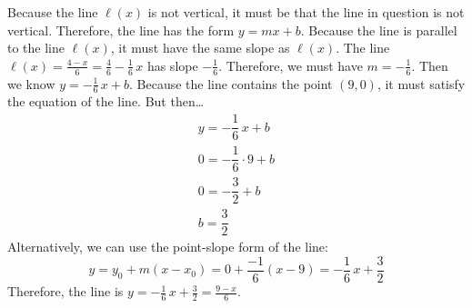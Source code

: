 \documentclass[11pt,letterpaper]{article}
\begin{document}
\sol Because the line $\ell(x)$ is not vertical, it must be that the line in question is not vertical. Therefore, the line has the form $y= mx + b$. Because the line is parallel to the line $\ell(x)$, it must have the same slope as $\ell(x)$. The line $\ell(x)= \frac{4 - x}{6}= \frac{4}{6} - \frac{1}{6}\,x$ has slope $-\frac{1}{6}$. Therefore, we must have $m= -\frac{1}{6}$. Then we know $y= -\frac{1}{6}\,x + b$. Because the line contains the point $(9, 0)$, it must satisfy the equation of the line. But then\dots
	\[
	\begin{gathered}
	y= -\dfrac{1}{6}\,x + b \\
	0= -\dfrac{1}{6} \cdot 9 + b \\
	0= -\dfrac{3}{2} + b \\
	b= \dfrac{3}{2}
	\end{gathered}
	\]
Alternatively, we can use the point-slope form of the line:
	\[
	y= y_0 + m(x - x_0)= 0 + \dfrac{-1}{6} (x - 9)= -\dfrac{1}{6}\,x + \dfrac{3}{2}
	\]
Therefore, the line is $y= -\frac{1}{6}\,x + \frac{3}{2}= \frac{9 - x}{6}$.
\end{document}

